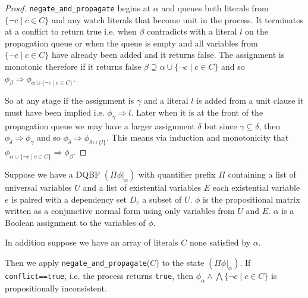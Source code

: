 \documentclass[runningheads]{llncs}
\begin{document}
	\begin{proof}
		\texttt{negate\_and\_propagate} begins at $\alpha$ and queues both literals from $\{\neg c \mid c \in C\}$ and any watch literals that become unit in the process. It terminates at a conflict to return true i.e. when $\beta$ contradicts with a literal $l$ on the propagation queue or when the queue is empty and all variables from $\{\neg c \mid c \in C\}$ have already been added and it returns false. 
		The assignment is monotonic therefore if it returns false $ \beta \supseteq {\alpha\cup\{\neg c \mid c \in C\}}$ and so  $ \phi_{\beta} \Rightarrow\phi_{\alpha\cup\{\neg c \mid c \in C\}} $.
		
		So at any stage if the assignment is $\gamma$ and a literal $l$ is added from a unit clause it must have been implied  i.e. $\phi_{\gamma}\Rightarrow l$. Later when it is at the front of the propagation queue we may have a larger assignment  $\delta$ but since $\gamma \subseteq \delta$, then $\phi_{\delta}\Rightarrow\phi_{\gamma}$ and so $\phi_{\delta} \Rightarrow \phi_{\delta\cup \{l\}}$. 
		This means via induction and monotonicity that $\phi_{\alpha\cup\{\neg c \mid c \in C\}} \Rightarrow \phi_{\beta}$.
		
		 
%		
%		
%		
%		
	
	\end{proof}

\begin{lemma}
	Suppose we have a DQBF $(\Pi \phi|_\alpha)$ with quantifier prefix $\Pi$ containing a list of universal variables $U$ and a list of existential variables $E$ each existential variable $e$ is paired with a dependency set $D_e$ a subset of $U$. $\phi$ is the propositional matrix written as a conjunctive normal form using only variables from $U$ and $E$. $\alpha$ is a Boolean assignment to the variables of $\phi$.
	
	In addition suppose we have an array of literals $C$ none satisfied by $\alpha$.
	
	Then we apply \texttt{negate\_and\_propagate}($C$) to the state $(\Pi \phi|_\alpha)$.	
	\sloppy If \texttt{conflict==true}, i.e. the process returns \texttt{true}, then $\phi_{\alpha}\wedge \bigwedge\{\neg c \mid c \in C\}$ is propositionally inconsistent.
\end{lemma}
\end{document}
